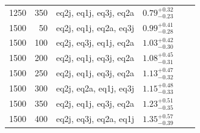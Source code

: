 \begin{table}
\begin{tabular}{rrcccc}
     1250 & 350 & eq2j, eq1j, eq3j, eq2a & $0.79_{-0.23}^{+0.32}$    \\ %
     1500 &  50 & eq2j, eq1j, eq2a, eq3j & $0.99_{-0.28}^{+0.41}$    \\ %
     1500 & 100 & eq2j, eq3j, eq1j, eq2a & $1.03_{-0.30}^{+0.42}$    \\ %
     1500 & 200 & eq2j, eq1j, eq3j, eq2a & $1.08_{-0.31}^{+0.45}$    \\ %
     1500 & 250 & eq2j, eq1j, eq3j, eq2a & $1.13_{-0.32}^{+0.47}$    \\ %
     1500 & 300 & eq2j, eq2a, eq1j, eq3j & $1.15_{-0.33}^{+0.48}$    \\ %
     1500 & 350 & eq2j, eq1j, eq3j, eq2a & $1.23_{-0.35}^{+0.51}$    \\ %
     1500 & 400 & eq2j, eq3j, eq2a, eq1j & $1.35_{-0.39}^{+0.57}$    \\ %


\end{tabular}
\end{table}
